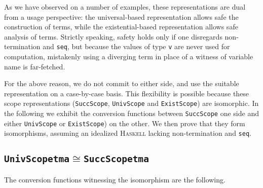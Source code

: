 \documentclass[9pt,preprint,authoryear]{sigplanconf}
\begin{document}
%
As we have observed on a number of examples, these representations
    are dual from a usage perspective{:} the universal-based representation
    allows safe the construction of terms, while the existential-based representation 
    allows safe analysis of terms.
    Strictly speaking, safety holds only if one disregards non-termination and \textcolor[rgb]{0,0,0.80}{\texttt{seq}}, 
    but because the
    values of type \textcolor[rgb]{0,0,0.80}{\texttt{v}} are never used for computation, mistakenly using a
    diverging term in place of a witness
    of variable name is far-fetched.%


%
For the above reason, we do not commit to either side, and use the
    suitable representation on a case-by-case basis. This flexibility
    is possible because these scope representations (\textcolor[rgb]{0,0,0.80}{\texttt{SuccScope}},
    \textcolor[rgb]{0,0,0.80}{\texttt{UnivScope}} and \textcolor[rgb]{0,0,0.80}{\texttt{ExistScope}}) are isomorphic. In the following
    we exhibit the conversion functions between \textcolor[rgb]{0,0,0.80}{\texttt{SuccScope}} one side
    and either \textcolor[rgb]{0,0,0.80}{\texttt{UnivScope}} or \textcolor[rgb]{0,0,0.80}{\texttt{ExistScope}}) on the other. We then
    prove that they form isomorphisms, assuming an idealized \textsc{Haskell}    lacking non-termination and \textcolor[rgb]{0,0,0.80}{\texttt{seq}}.%


\subsection{\textcolor[rgb]{0,0,0.80}{\texttt{UnivScope}}\textcolor[rgb]{0,0,0.80}{\texttt{\mbox{\hspace{0.50em}}}}\textcolor[rgb]{0,0,0.80}{\texttt{tm}}\textcolor[rgb]{0,0,0.80}{\texttt{\mbox{\hspace{0.50em}}}}\textcolor[rgb]{0,0,0.80}{\texttt{a}}\textcolor[rgb]{0,0,0.80}{\texttt{\mbox{\hspace{0.50em}}}}\textcolor[rgb]{0.70,0.13,0.13}{\texttt{\ensuremath{\cong}}}\textcolor[rgb]{0,0,0.80}{\texttt{\mbox{\hspace{0.50em}}}}\textcolor[rgb]{0,0,0.80}{\texttt{SuccScope}}\textcolor[rgb]{0,0,0.80}{\texttt{\mbox{\hspace{0.50em}}}}\textcolor[rgb]{0,0,0.80}{\texttt{tm}}\textcolor[rgb]{0,0,0.80}{\texttt{\mbox{\hspace{0.50em}}}}\textcolor[rgb]{0,0,0.80}{\texttt{a}}}

%
The conversion functions witnessing the isomorphism are the following.%
\end{document}
